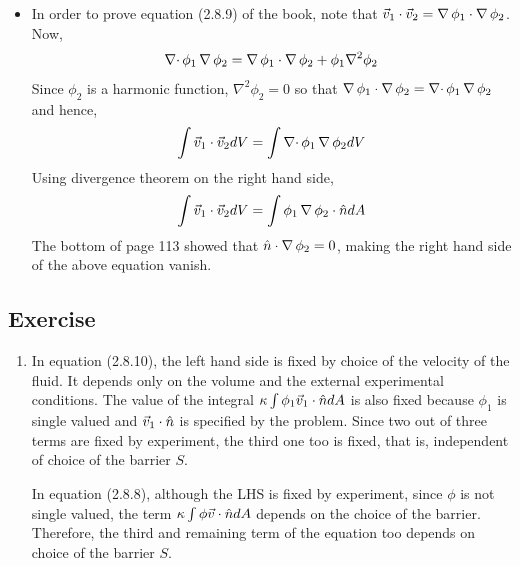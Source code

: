 \begin{itemize}
\item In order to prove equation (2.8.9) of the book, note that $\vec{v}_1\cdot\vec{v}_2 = \operatorname{\nabla}{\phi}_1\cdot\operatorname{\nabla}{\phi}_2$. Now, 
\[
\operatorname{\nabla\cdot}{\phi_1\operatorname{\nabla}{\phi}_2} = \operatorname{\nabla}{\phi}_1\cdot\operatorname{\nabla}{\phi}_2 + \phi_1\nabla^2\phi_2
\]
Since $\phi_2$ is a harmonic function, $\nabla^2\phi_2 = 0$ so that $\operatorname{\nabla}{\phi}_1\cdot\operatorname{\nabla}{\phi}_2 = \operatorname{\nabla\cdot}{\phi_1\operatorname{\nabla}{\phi}_2}$ and hence,
\[
\int \vec{v}_1\cdot\vec{v}_2 dV = \int \operatorname{\nabla\cdot}{\phi_1\operatorname{\nabla}{\phi}_2} dV
\]
Using divergence theorem on the right hand side,
\[
\int \vec{v}_1\cdot\vec{v}_2 dV = \int \phi_1\operatorname{\nabla}{\phi}_2\cdot\hat{n} dA
\]
The bottom of page 113 showed that $\hat{n}\cdot\operatorname{\nabla}{\phi}_2 = 0$, making the right hand side of the above equation vanish.
\end{itemize}

\subsection{Exercise}
\begin{enumerate}
\item In equation (2.8.10), the left hand side is fixed by choice of the velocity of the fluid. It depends only on the volume and the external experimental conditions. The value of the 
integral $\kappa\int\phi_1\vec{v}_1\cdot\hat{n} dA$ is also fixed because $\phi_1$ is single valued and $\vec{v}_1\cdot\hat{n}$ is specified by the problem. Since two out of three terms are fixed 
by experiment, the third one too is fixed, that is, independent of choice of the barrier $S$.

In equation (2.8.8), although the LHS is fixed by experiment, since $\phi$ is not single valued, the term $\kappa\int\phi\vec{v}\cdot\hat{n} dA$ depends on the choice of the barrier. 
Therefore, the third and remaining term of the equation too depends on choice of the barrier $S$.
\end{enumerate}


